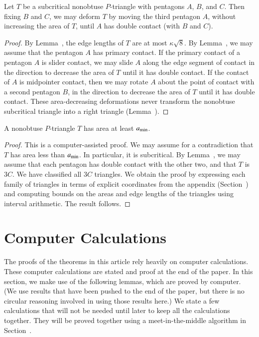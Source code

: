 \begin{lemma} 
  Let $T$ be a subcritical nonobtuse $P$-triangle with pentagons $A$,
  $B$, and $C$.  Then fixing $B$ and $C$, we may deform $T$ by moving
  the third pentagon $A$, without increasing the area of $T$, until
  $A$ has double contact (with $B$ and $C$).
\end{lemma}

\begin{proof}
  By Lemma~, the edge lengths of $T$ are at most
  $\kappa\sqrt8$.  By Lemma~, we may assume that
  the pentagon $A$ has primary contact.  If the primary contact of a
  pentagon $A$ is slider contact, we may slide $A$ along the edge
  segment of contact in the direction to decrease the area of $T$
  until it has double contact.  If the contact of $A$ is midpointer
  contact, then we may rotate $A$ about the point of contact with a
  second pentagon $B$, in the direction to decrease the area of $T$
  until it has double contact.  These area-decreasing deformations
  never transform the nonobtuse subcritical triangle into a right
  triangle (Lemma~).
\end{proof}


\begin{lemma}  
A nonobtuse $P$-triangle $T$ has area at least $a_\text{min}$.
\end{lemma}

\begin{proof} 
  This is a computer-assisted proof.  We may assume for a contradiction
  that $T$ has area less than $a_\text{min}$.  In particular, it is
  subcritical.  By Lemma~, we may assume that each
  pentagon has double contact with the other two, and that $T$ is
  $3C$.  We have classified all $3C$ triangles.  We obtain the proof
  by expressing each family of triangles in terms of explicit
  coordinates from the appendix (Section~) and
  computing bounds on the areas and edge lengths of the triangles
  using interval arithmetic.  The result follows.
\end{proof}

\section{Computer Calculations}

The proofs of the theorems in this article rely heavily on computer calculations.
These computer calculations are stated and proof at the end of the paper.
In this section, we make use of the following lemmas, which are proved by
computer.  (We use results that have been pushed to the end of the paper, but
there is no circular reasoning involved in using those results here.)  We state
a few calculations that will not be needed until later to keep all  the calculations
together.  They will be proved together using a meet-in-the-middle algorithm in
Section~.

